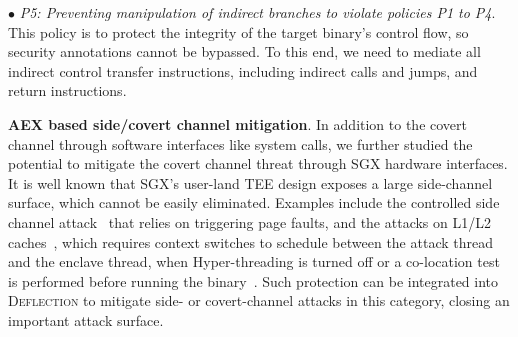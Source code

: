 
\vspace{2pt}\noindent$\bullet$\textit{ P5: Preventing manipulation of indirect branches to violate policies P1 to P4}. This policy is to protect the integrity of the target binary's control flow, so security annotations cannot be bypassed. To this end, we need to mediate all indirect control transfer instructions, including indirect calls and jumps, and return instructions.



\vspace{3pt}\noindent\textbf{AEX based side/covert channel mitigation}. 
In addition to the covert channel through software interfaces like system calls, we further studied the potential to mitigate the covert channel threat through SGX hardware interfaces.
It is well known that SGX's user-land TEE design exposes a large side-channel surface, which cannot be easily eliminated. \DIFdelbegin {}\DIFdelend Examples include the controlled side channel attack~\cite{xu2015controlled} that relies on triggering page faults, and the attacks on L1/L2 caches~\cite{wang2017leaky}, which requires context switches to schedule between the attack thread and the enclave thread, when Hyper-threading is turned off or a co-location test is performed before running the binary~\cite{chen2018racing}. Such protection can be integrated into \textsc{Deflection} to mitigate \DIFdelbegin {}\DIFdelend side- or covert-channel attacks in this category, closing an important attack surface.


